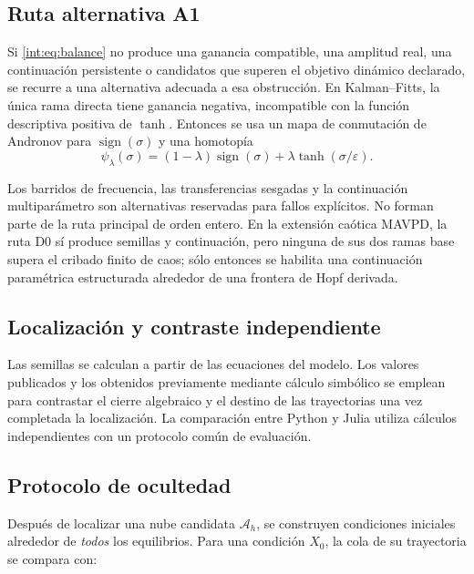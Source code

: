 \subsection{Ruta alternativa A1}

Si \eqref{int:eq:balance} no produce una ganancia compatible, una amplitud real,
una continuación persistente o candidatos que superen el objetivo dinámico
declarado, se recurre a una alternativa adecuada a esa obstrucción. En Kalman--Fitts, la única rama directa tiene
ganancia negativa, incompatible con la función descriptiva positiva de
\(\tanh\). Entonces se usa un mapa de conmutación de Andronov para
\(\operatorname{sign}(\sigma)\) y una homotopía
\begin{equation}
  \psi_\lambda(\sigma)=
  (1-\lambda)\operatorname{sign}(\sigma)
  +\lambda\tanh(\sigma/\varepsilon).
  \label{int:eq:sign-tanh}
\end{equation}

Los barridos de frecuencia, las transferencias sesgadas y la continuación
multiparámetro son alternativas reservadas para fallos explícitos. No forman
parte de la ruta principal de orden entero. En la extensión caótica MAVPD, la
ruta D0 sí produce semillas y continuación, pero ninguna de sus dos ramas base
supera el cribado finito de caos; sólo entonces se habilita una continuación
paramétrica estructurada alrededor de una frontera de Hopf derivada.

\subsection{Localización y contraste independiente}

Las semillas se calculan a partir de las ecuaciones del modelo. Los valores
publicados y los obtenidos previamente mediante cálculo simbólico se emplean
para contrastar el cierre algebraico y el destino de las trayectorias una
vez completada la localización. La comparación entre Python y Julia utiliza
cálculos independientes con un protocolo común de evaluación.

\subsection{Protocolo de ocultedad}

Después de localizar una nube candidata \(\mathcal A_h\), se construyen
condiciones iniciales alrededor de \emph{todos} los equilibrios. Para una
condición \(X_0\), la cola de su trayectoria se compara con:

